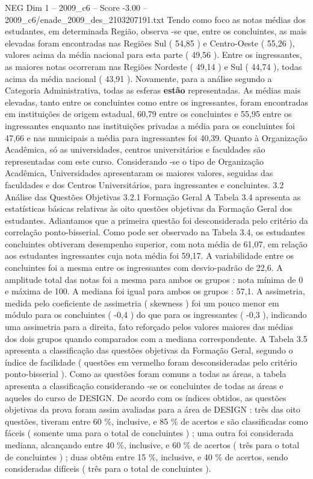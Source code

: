 \begin{textsample}{NEG Dim 1 – 2009\_c6 – Score -3.00 – 2009\_c6/enade\_2009\_des\_2103207191.txt}
Tendo como foco as notas médias dos estudantes, em determinada Região, observa -se que, entre os concluintes, as mais elevadas foram encontradas nas Regiões Sul ( 54,85 ) e Centro-Oeste ( 55,26 ), valores acima da média nacional para esta parte ( 49,56 ).
Entre os ingressantes, as maiores notas ocorreram nas Regiões Nordeste ( 49,14 ) e Sul ( 44,74 ), todas acima da média nacional ( 43,91 ).
Novamente, para a análise segundo a Categoria Administrativa, todas as esferas \textbf{estão} representadas.
As médias mais elevadas, tanto entre os concluintes como entre os ingressantes, foram encontradas em instituições de origem estadual, 60,79 entre os concluintes e 55,95 entre os ingressantes enquanto nas instituições privadas a média para os concluintes foi 47,66 e nas municipais a média para ingressantes foi 40,39.
Quanto à Organização Acadêmica, só as universidades, centros universitários e faculdades são representadas com este curso.
Considerando -se o tipo de Organização Acadêmica, Universidades apresentaram os maiores valores, seguidas das faculdades e dos Centros Universitários, para ingressantes e concluintes. 3.2 Análise das Questões Objetivas 3.2.1 Formação Geral A Tabela 3.4 apresenta as estatísticas básicas relativas às oito questões objetivas da Formação Geral dos estudantes.
Adiantamos que a primeira questão foi desconsiderada pelo critério da correlação ponto-bisserial.
Como pode ser observado na Tabela 3.4, os estudantes concluintes obtiveram desempenho superior, com nota média de 61,07, em relação aos estudantes ingressantes cuja nota média foi 59,17.
A variabilidade entre os concluintes foi a mesma entre os ingressantes com desvio-padrão de 22,6.
A amplitude total das notas foi a mesma para ambos os grupos : nota mínima de 0 e máxima de 100.
A mediana foi igual para ambos os grupos : 57,1.
A assimetria, medida pelo coeficiente de assimetria ( skewness ) foi um pouco menor em módulo para os concluintes ( -0,4 ) do que para os ingressantes ( -0,3 ), indicando uma assimetria para a direita, fato reforçado pelos valores maiores das médias dos dois grupos quando comparados com a mediana correspondente.
A Tabela 3.5 apresenta a classificação das questões objetivas da Formação Geral, segundo o índice de facilidade ( questões em vermelho foram desconsideradas pelo critério ponto-bisserial ).
Como as questões foram comuns a todas as áreas, a tabela apresenta a classificação considerando -se os concluintes de todas as áreas e aqueles do curso de DESIGN.
De acordo com os índices obtidos, as questões objetivas da prova foram assim avaliadas para a área de DESIGN : três das oito questões, tiveram entre 60 \%, inclusive, e 85 \% de acertos e são classificadas como fáceis ( somente uma para o total de concluintes ) ; uma outra foi considerada mediana, alcançando entre 40 \%, inclusive, e 60 \% de acertos ( três para o total de concluintes ) ; duas obtêm entre 15 \%, inclusive, e 40 \% de acertos, sendo consideradas difíceis ( três para o total de concluintes ).

\end{textsample}
